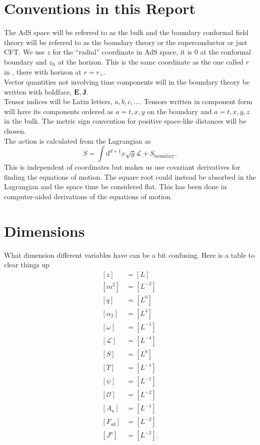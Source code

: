 \documentclass[12pt]{report}
\renewcommand{\d}{\ensuremath{\mathrm{d}}}
\renewcommand{\L}{\ensuremath{\mathcal{L}}}
\begin{document}
\begin{appendices}
\chapter{Conventions in this Report\label{conventions}}
The AdS space will be referred to as the bulk and the boundary conformal field theory will be referred to as the boundary theory or the superconductor or just CFT. We use $z$ for the ``radial'' coordinate in AdS space, it is 0 at the conformal boundary and $z_h$ at the horizon. This is the same coordinate as the one called $r$ in \cite{hartnoll8}, there with horizon at $r=r_+$.\\
Vector quantities not involving time components will in the boundary theory be written with boldface, $\mathbf{E}, \mathbf{J}$.\\
Tensor indices will be Latin letters, $a,b,c,...$. Tensors written in component form will have its components ordered as $a=t,x,y$ on the boundary and $a=t,x,y,z$ in the bulk.
The metric sign convention for positive space-like distances will be chosen.\\
The action is calculated from the Lagrangian as
\begin{equation}
 S=\int\d^{d+1} x\sqrt{g}\L+S_\mathrm{boundary}.
\end{equation}
This is independent of coordinates but makes us use covariant derivatives for finding the equations of motion. The square root could instead be absorbed in the Lagrangian and the space time be considered flat. This has been done in computer-aided derivations of the equations of motion.
\chapter{Dimensions}
What dimension different variables have can be a bit confusing. Here is a table to clear things up
\begin{equation}
 \begin{split}
[z]&=[L]\\
[m^2]&=[L^{-2}]\\
[q]&=[L^{0}]\\
[\alpha_2]&=[L^{4}]\\
[\omega]&=[L^{-1}]\\
[\mathcal{L}]&=[L^{-4}]\\
[S]&=[L^0]\\
[T]&=[L^{-1}]\\
[\psi]&=[L^{-1}]\\
[\mathcal{O}]&=[L^{-2}]\\
[A_a]&=[L^{-1}]\\
[F_{ab}]&=[L^{-2}]\\
[J^a]&=[L^{-2}].
 \end{split}
\end{equation}



\end{appendices}
\end{document}
